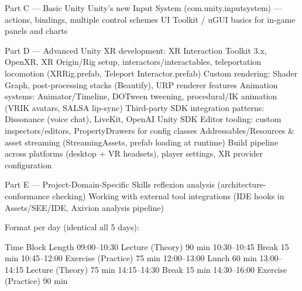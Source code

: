 Part C — Basic Unity
Unity's new Input System (com.unity.inputsystem) — actions, bindings, multiple control schemes
UI Toolkit / uGUI basics for in-game panels and charts


Part D — Advanced Unity
XR development: XR Interaction Toolkit 3.x, OpenXR, XR Origin/Rig setup, interactors/interactables, teleportation locomotion (XRRig.prefab, Teleport Interactor.prefab)
Custom rendering: Shader Graph, post-processing stacks (Beautify), URP renderer features
Animation systems: Animator/Timeline, DOTween tweening, procedural/IK animation (VRIK avatars, SALSA lip-sync)
Third-party SDK integration patterns: Dissonance (voice chat), LiveKit, OpenAI Unity SDK
Editor tooling: custom inspectors/editors, PropertyDrawers for config classes
Addressables/Resources & asset streaming (StreamingAssets, prefab loading at runtime)
Build pipeline across platforms (desktop + VR headsets), player settings, XR provider configuration

Part E — Project-Domain-Specific Skills
reflexion analysis (architecture-conformance checking)
Working with external tool integrations (IDE hooks in Assets/SEE/IDE, Axivion analysis pipeline)

Format per day (identical all 5 days):

Time	Block	Length
09:00–10:30	Lecture (Theory)	90 min
10:30–10:45	Break	15 min
10:45–12:00	Exercise (Practice)	75 min
12:00–13:00	Lunch	60 min
13:00–14:15	Lecture (Theory)	75 min
14:15–14:30	Break	15 min
14:30–16:00	Exercise (Practice)	90 min

